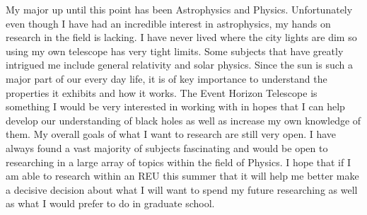 \documentclass[11pt,a4paper,sans]{moderncv} %
\begin{document}
\hspace{1cm}My major up until this point has been Astrophysics and Physics. Unfortunately even though I have had an incredible interest in astrophysics, my hands on research in the field is lacking. I have never lived where the city lights are dim so using my own telescope has very tight limits. Some subjects that have greatly intrigued me include general relativity and solar physics. Since the sun is such a major part of our every day life, it is of key importance to understand the properties it exhibits and how it works. The Event Horizon Telescope is something I would be very interested in working with in hopes that I can help develop our understanding of black holes as well as increase my own knowledge of them. My overall goals of what I want to research are still very open. I have always found a vast majority of subjects fascinating and would be open to researching in a large array of topics within the field of Physics. I hope that if I am able to research within an REU this summer that it will help me better make a decisive decision about what I will want to spend my future researching as well as what I would prefer to do in graduate school.

\makeletterclosing %

\end{document}
